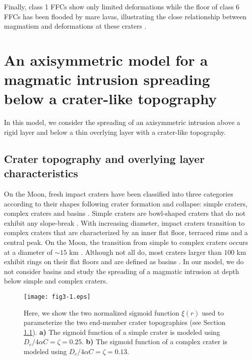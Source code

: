 	
Finally, class 1  FFCs show only limited deformations  while the floor
of class 6 FFCs has been flooded by mare lavas, illustrating the close
relationship  between  magmatism  and deformations  at  these  craters
\citep{Schultz:1976kt,Jozwiak:2012dq}.

\section{An  axisymmetric model  for  a  magmatic intrusion  spreading
  below a crater-like topography}

In this model, we consider  the spreading of an axisymmetric intrusion
above  a  rigid  layer  and  below  a  thin  overlying  layer  with  a
crater-like topography.
	
\subsection{Crater topography and overlying layer characteristics}
\label{C5-Crater_Topography}
	
On  the Moon,  fresh impact  craters have  been classified  into three
categories according  to their  shapes following crater  formation and
collapse:    simple    craters,    complex    craters    and    basins
\citep{Pike:1974ux,Schultz:1976vl,Pike:1980eh,Baker:2011kh}.    Simple
craters are  bowl-shaped craters that  do not exhibit  any slope-break
\citep{Pike:1980eh}.    With  increasing   diameter,  impact   craters
transition to complex craters that  are characterized by an inner flat
floor, terraced rims  and a central peak. On the  Moon, the transition
from simple  to complex craters occurs  at a diameter of  $\sim 15$ km
\citep{Pike:1980eh,Hiesinger:2006cb,OKeefe:1999uj,Kalynn:2013fg}.
Although not all  do, most craters larger than $100$  km exhibit rings
on    their    flat    floors    and    are    defined    as    basins
\citep{Wilhelms:1987vb,Schultz:1988wb}.   In  our  model,  we  do  not
consider basins  and study  the spreading of  a magmatic  intrusion at
depth below simple and complex craters.

\begin{figure}[h!]
  \graphicspath{ {/Users/thorey/Documents/These/Submission/Article/FFC_JGR_2013/Paper_APRES_2nd_REVIEW/} }
  \centering
  \noindent\texttt{[image: fig3-1.eps]}
  \caption{ Here, we show the two normalized sigmoid function $\xi(r)$
    used to  parameterize the two end-member  crater topographies (see
    Section  \ref{C5-Crater_Topography}).    \textbf{a)}  The  sigmoid
    function    of    a    simple     crater    is    modeled    using
    $D_c/4\alpha C=\zeta=0.25$.  \textbf{b)} The sigmoid function of a
    complex crater is modeled using $D_c/4\alpha C=\zeta=0.13$. }
  \label{C5-fig3-1}
\end{figure}
	
